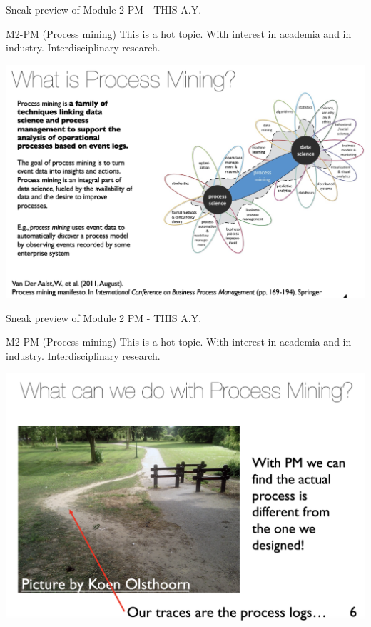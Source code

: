 \documentclass{beamer}%
\begin{document}
\begin{frame}{Sneak preview of Module 2  PM - THIS A.Y.}
	\centering 
	
	\begin{block}{M2-PM (Process mining)}
		This is a hot topic. With interest in academia and in industry. Interdisciplinary research.	
	\end{block}
		\includegraphics[width=0.9\linewidth]{figures/pm/pm.png}
\end{frame}

\begin{frame}{Sneak preview of Module 2  PM - THIS A.Y.}
	\centering 
	
	\begin{block}{M2-PM (Process mining)}
		This is a hot topic. With interest in academia and in industry. Interdisciplinary research.	
	\end{block}
	\includegraphics[width=0.8\linewidth]{figures/pm/park.png}
\end{frame}
\end{document}
